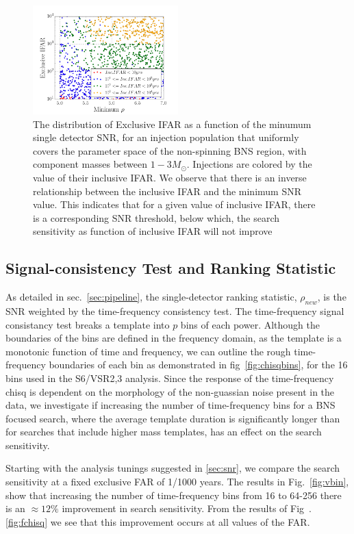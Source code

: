\begin{figure}
\includegraphics[width=0.5\textwidth]{papers/bns_o1_dev/figures/ifarifar.png}
\caption{\label{fig:ifarifar} 
The distribution of Exclusive IFAR as a function of the minumum single detector SNR, for an injection population that uniformly covers the parameter space of the non-spinning BNS region, with component masses between $1- 3M_\odot$. Injections are colored by the value of their inclusive IFAR. We observe that there is an inverse relationship between the inclusive IFAR and the minimum SNR value. This indicates that for a given value of inclusive IFAR, there is a corresponding SNR threshold, below which, the search sensitivity as function of inclusive IFAR will not improve
}
\end{figure}


\subsection{Signal-consistency Test and Ranking Statistic}

As detailed in sec.~\ref{sec:pipeline}, the single-detector ranking statistic, $\rho_{new}$, is the SNR weighted by the time-frequency consistency test. The time-frequency signal consistancy test breaks a template into $p$ bins of each power. Although the boundaries of the bins are defined in the frequency domain, as the template is a monotonic function of time and frequency, we can outline the rough time-frequency boundaries of each bin as demonstrated in fig~\ref{fig:chisqbins}, for the 16 bins used in the S6/VSR2,3 analysis. Since the response of the time-frequency chisq is dependent on the morphology of the non-guassian noise present in the data, we investigate if increasing the number of time-frequency bins for a BNS focused search, where the average template duration is significantly longer than for searches that include higher mass templates, has an effect on the search sensitivity.

Starting with the analysis tunings suggested in \ref{sec:snr}, we compare the search sensitivity at a fixed exclusive FAR of 1/1000 years. The results in Fig.~\ref{fig:vbin}, show that increasing the number of time-frequency bins from 16 to 64-256 there is an $\approx 12\%$ improvement in search sensitivity. From the results of Fig~.\ref{fig:fchisq} we see  that this improvement occurs at all values of the FAR.

